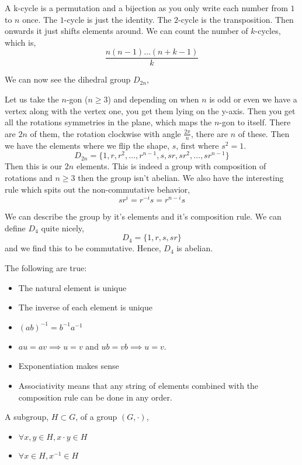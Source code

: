 A k-cycle is a permutation and a bijection as you only write each number from $1$ to $n$ once. The $1$-cycle is just the identity. The $2$-cycle is the transposition. Then onwards it just shifts elements around. We can count the number of $k$-cycles, which is,
$$ \frac{n(n-1) \dots (n + k -1)}{k} $$

We can now see the dihedral group $D_{2n}$,
\begin{ndefi}
  Let us take the $n$-gon ($n \ge 3$) and depending on when $n$ is odd or even we have a vertex along with the vertex one, you get them lying on the y-axis. Then you get all the rotations symmetries in the plane, which maps the $n$-gon to itself. There are $2n$ of them, the rotation clockwise with angle $\frac{2\pi}{n}$, there are $n$ of these. Then we have the elements where we flip the shape, $s$, first where $s^2 = 1$.
  $$ D_{2n} = \{1, r, r^2, \dots, r^{n-1}, s, sr, sr^2, \dots, sr^{n-1} \} $$
  Then this is our $2n$ elements. This is indeed a group with composition of rotations and $n \ge 3$ then the group isn't abelian. We also have the interesting rule which spits out the non-commutative behavior,
  $$ sr^i = r^{-i}s = r^{n-i}s $$
\end{ndefi}

We can describe the group by it's elements and it's composition rule. We can define $D_4$ quite nicely,
$$ D_{4} = \{1, r, s, sr\} $$
and we find this to be commutative. Hence, $D_4$ is abelian.

\begin{nlemma}
  The following are true:
  \begin{itemize}
    \item The natural element is unique
    \item The inverse of each element is unique
    \item $(ab)^{-1} = b^{-1}a^{-1}$
    \item $au = av \implies u = v$ and $ub = vb \implies u = v$.
    \item Exponentiation makes sense
    \item Associativity means that any string of elements combined with the composition rule can be done in any order.
  \end{itemize}
\end{nlemma}


\begin{ndefi}[Subgroup]
  A subgroup, $H \subset G$, of a group $(G, \cdot)$,
  \begin{itemize}
    \item $\forall x, y \in H, x \cdot y \in H$
    \item $\forall x \in H, x^{-1} \in H$
  \end{itemize}
\end{ndefi}

